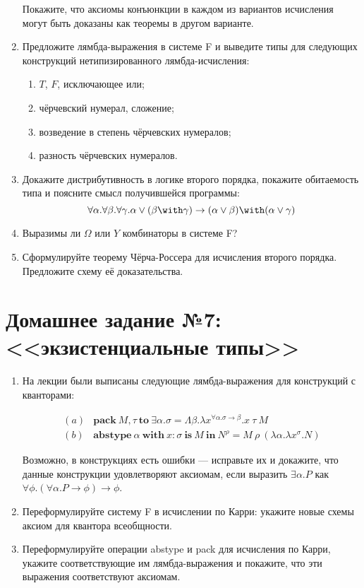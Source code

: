 \documentclass[10pt,a4paper,oneside]{article}
\begin{document}
\begin{enumerate}
Покажите, что аксиомы конъюнкции в каждом из вариантов исчисления могут быть доказаны как теоремы в другом варианте.

\item Предложите лямбда-выражения в системе F и выведите типы для следующих конструкций нетипизированного лямбда-исчисления:
\begin{enumerate}
\item $T$, $F$, исключающее или;
\item чёрчевский нумерал, сложение;
\item возведение в степень чёрчевских нумералов;
\item разность чёрчевских нумералов.
\end{enumerate}

\item Докажите дистрибутивность в логике второго порядка, покажите обитаемость типа и поясните смысл получившейся программы:
$$\forall\alpha.\forall\beta.\forall\gamma.\alpha\vee(\beta\with\gamma)\rightarrow(\alpha\vee\beta)\with(\alpha\vee\gamma)$$

\item Выразимы ли $\Omega$ или $Y$ комбинаторы в системе F?

\item Сформулируйте теорему Чёрча-Россера для исчисления второго порядка. Предложите схему её доказательства.

\end{enumerate}

\section*{Домашнее задание №7: <<экзистенциальные типы>>}
\begin{enumerate}
\item На лекции были выписаны следующие лямбда-выражения для конструкций с кванторами:

$$\begin{array}{ll}
(a) & \textbf{pack}\ M,\tau\ \textbf{to}\ \exists\alpha.\sigma = \Lambda\beta.\lambda x^{\forall\alpha.\sigma\rightarrow\beta}.x\ \tau\ M\\
(b) & \textbf{abstype}\ \alpha\ \textbf{with}\ x:\sigma\ \textbf{is}\ M\ \textbf{in}\ N^\rho = M\ \rho\ (\lambda\alpha.\lambda x^\sigma.N)
\end{array}$$

Возможно, в конструкциях есть ошибки --- исправьте их и докажите, что данные конструкции удовлетворяют аксиомам,
если выразить $\exists \alpha.P$ как $\forall \phi.(\forall\alpha.P\rightarrow\phi)\rightarrow\phi$.

\item Переформулируйте систему F в исчислении по Карри: укажите новые схемы аксиом для квантора всеобщности.
\item Переформулируйте операции abstype и pack для исчисления по Карри, укажите соответствующие им лямбда-выражения
и покажите, что эти выражения соответствуют аксиомам.
\end{enumerate}
\end{document}

